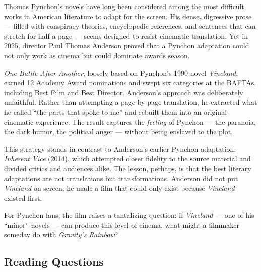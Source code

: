 \documentclass[10pt,a4paper]{article}
\begin{document}
\begin{tcolorbox}[colback=white, colframe=black]
\small
Thomas Pynchon's novels have long been considered among the most
difficult works in American literature to adapt for the screen. His
dense, digressive prose --- filled with conspiracy theories,
encyclopedic references, and sentences that can stretch for half a
page --- seems designed to resist cinematic translation. Yet in 2025,
director Paul Thomas Anderson proved that a Pynchon adaptation could
not only work as cinema but could dominate awards season.

\emph{One Battle After Another}, loosely based on Pynchon's 1990
novel \emph{Vineland}, earned 12 Academy Award nominations and swept
six categories at the BAFTAs, including Best Film and Best Director.
Anderson's approach was deliberately unfaithful. Rather than
attempting a page-by-page translation, he extracted what he called
``the parts that spoke to me'' and rebuilt them into an original
cinematic experience. The result captures the \emph{feeling} of
Pynchon --- the paranoia, the dark humor, the political anger ---
without being enslaved to the plot.

This strategy stands in contrast to Anderson's earlier Pynchon
adaptation, \emph{Inherent Vice} (2014), which attempted closer
fidelity to the source material and divided critics and audiences
alike. The lesson, perhaps, is that the best literary adaptations
are not translations but transformations. Anderson did not put
\emph{Vineland} on screen; he made a film that could only exist
because \emph{Vineland} existed first.

For Pynchon fans, the film raises a tantalizing question: if
\emph{Vineland} --- one of his ``minor'' novels --- can produce this
level of cinema, what might a filmmaker someday do with
\emph{Gravity's Rainbow}?
\end{tcolorbox}

\subsection*{Reading Questions}
\end{document}
